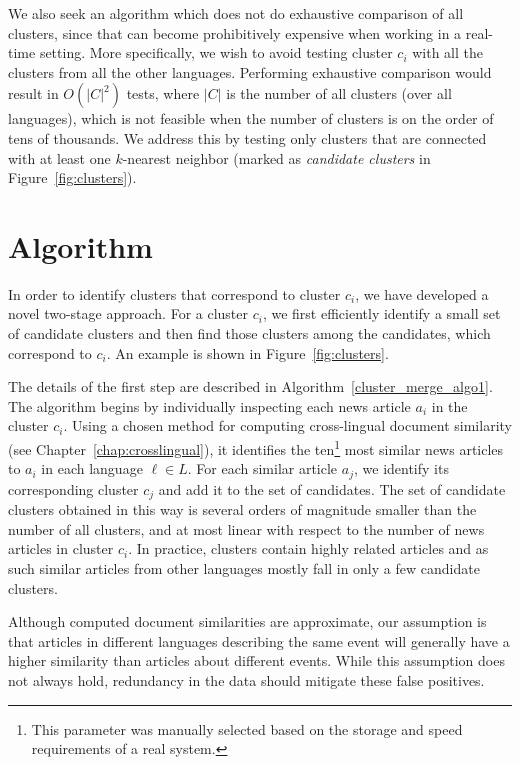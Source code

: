 We also seek an algorithm which does not do exhaustive comparison of all clusters, since that can become prohibitively expensive when working in a real-time setting. More specifically, we wish to avoid testing cluster $c_i$ with all the clusters from all the other languages. Performing exhaustive comparison would result in $O(|C|^2)$ tests, where $|C|$ is the number of all clusters (over all languages), which is not feasible when the number of clusters is on the order of tens of thousands. We address this by testing only clusters that are connected with at least one $k$-nearest neighbor (marked as \emph{candidate clusters} in Figure~\ref{fig:clusters}).

\section{Algorithm}\label{algo:features}

In order to identify clusters that correspond to cluster $c_i$, we have developed
a novel two-stage approach. For a cluster $c_i$, we first efficiently identify a small set of
candidate clusters and then find those clusters among the candidates, which correspond to $c_i$. 
An example is  shown in  Figure~\ref{fig:clusters}.

The details of the first step are described in Algorithm~\ref{cluster_merge_algo1}. The algorithm
begins by individually inspecting each news article $a_i$ in the cluster $c_i$. Using a chosen
method for computing cross-lingual document similarity (see Chapter~\ref{chap:crosslingual}), it identifies
the ten\footnote{This parameter was manually selected based on the storage and speed requirements of a real system.}
most similar news articles to $a_i$ in each language $\ell \in L$. For each similar
article $a_j$, we identify its corresponding  cluster $c_j$ and add it to the set of candidates.
The set of candidate clusters obtained in this way is several orders of magnitude smaller than the
number of all clusters, and at most linear with respect to the number of news articles in
cluster $c_i$. In practice, clusters contain highly related articles and as such similar
articles from other languages mostly fall in only a few candidate clusters.

Although computed document similarities are approximate, our  assumption is that articles
in different languages describing the same event will generally have a higher similarity
than articles about different events. While this assumption does not always hold, redundancy
in the data should mitigate these false positives.

